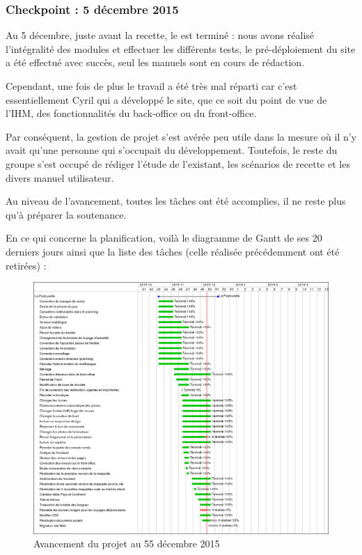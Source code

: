 \documentclass[11pt]{report}
\begin{document}
\subsubsection*{Checkpoint : 5 décembre 2015}
\par Au 5 décembre, juste avant la recette, le est terminé : nous
avons réalisé l'intégralité des modules et effectuer les différents tests, le 
pré-déploiement du site a été effectué avec succès, seul les manuels sont en 
cours de rédaction. \\
\par Cependant, une fois de plus le travail a été très mal réparti car c'est
essentiellement Cyril qui a développé le site, que ce soit du point de vue de
l'IHM, des fonctionnalités du back-office ou du front-office. \\
\par Par conséquent, la gestion de projet s'est avérée peu utile dans la mesure
où il n'y avait qu'une personne qui s'occupait du développement. Toutefois, le
reste du groupe s'est occupé de rédiger l'étude de l'existant, les scénarios de
recette et les divers manuel utilisateur.\\
\par Au niveau de l'avancement, toutes les tâches ont été accomplies, il ne 
reste plus qu'à préparer la soutenance. \\
\par En ce qui concerne la planification, voilà le diagramme de Gantt de ses 20
derniers jours ainsi que la liste des tâches (celle réalisée précédemment ont
été retirées) :


\begin{landscape}
\begin{figure}[t]
    \caption{Avancement du projet au 55 décembre 2015}
   \includegraphics[scale=0.5]{include/gantt5-12.png}
\end{figure}
\end{landscape}
\end{document}
